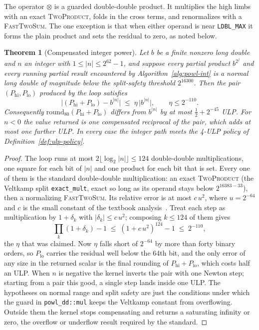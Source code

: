 \documentclass[11pt]{article}
\theoremstyle{plain}
\newtheorem{theorem}{Theorem}
\theoremstyle{remark}
\begin{document}
The operator $\otimes$ is a guarded double-double product.  It multiplies the
high limbs with an exact \textsc{TwoProduct}, folds in the cross terms, and
renormalizes with a \textsc{FastTwoSum}.  The one exception is that when either operand is near \texttt{LDBL\_MAX} it
forms the plain product and sets the residual to zero, as noted below.

\begin{theorem}[Compensated integer power]
\label{thm:powl-int}
Let $b$ be a finite nonzero long double and $n$ an integer with
$1 \le |n| \le 2^{62}-1$, and suppose every partial product $b^{2^{j}}$ and every
running partial result encountered by Algorithm~\ref{alg:powl-int} is a normal
long double of magnitude below the split-safety threshold $2^{16300}$.  Then the
pair $(P_{\mathrm{hi}}, P_{\mathrm{lo}})$ produced by the loop satisfies
\[
  \bigl| (P_{\mathrm{hi}} + P_{\mathrm{lo}}) - b^{|n|} \bigr|
  \;\le\; \eta\,\bigl| b^{|n|} \bigr|,
  \qquad \eta \le 2^{-110}.
\]
Consequently $\mathrm{round}_{80}(P_{\mathrm{hi}} + P_{\mathrm{lo}})$ differs from
$b^{|n|}$ by at most $\tfrac12 + 2^{-45}$ ULP.  For $n < 0$ the value returned is
one compensated reciprocal of the pair, which adds at most one further ULP.  In
every case the integer path meets the 4-ULP policy of
Definition~\ref{def:ulp-policy}.
\end{theorem}

\begin{proof}
The loop runs at most $2\lfloor \log_2 |n| \rfloor \le 124$ double-double
multiplications, one square for each bit of $|n|$ and one product for each bit
that is set.  Every one of them is the standard double-double multiplication: an
exact \textsc{TwoProduct} (the Veltkamp split \texttt{exact\_mult}, exact so long
as its operand stays below $2^{16383-33}$), then a normalizing
\textsc{FastTwoSum}.  Its relative error is at most $c\,u^{2}$, where
$u = 2^{-64}$ and $c$ is the small constant of the textbook
analysis~\cite{handbook}.  Treat each step as multiplication by $1 + \delta_k$
with $|\delta_k| \le c\,u^{2}$; composing $k \le 124$ of them gives
\[
  \prod_{k}(1 + \delta_k) - 1
  \;\le\; (1 + c\,u^{2})^{124} - 1
  \;\le\; 2^{-110},
\]
the $\eta$ that was claimed.  Now $\eta$ falls short of $2^{-64}$ by more than
forty binary orders, so $P_{\mathrm{lo}}$ carries the residual well below the
64th bit, and the only error of any size in the returned scalar is the final
rounding of $P_{\mathrm{hi}} + P_{\mathrm{lo}}$, which costs half an ULP.  When
$n$ is negative the kernel inverts the pair with one Newton step; starting from a
pair this good, a single step lands inside one ULP.  The hypotheses on normal
range and split safety are just the conditions under which the guard in
\texttt{powl\_dd::mul} keeps the Veltkamp constant from overflowing.  Outside
them the kernel stops compensating and returns a saturating infinity or zero,
the overflow or underflow result required by the standard.
\end{proof}
\end{document}
